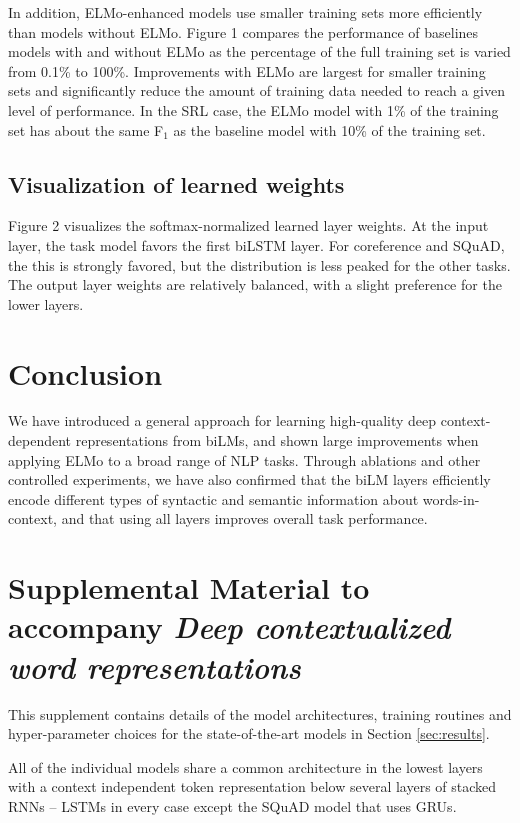 \documentclass[11pt,a4paper]{article}
\newcommand{\ELMO}{ELMo}
\begin{document}
In addition, \ELMO{}-enhanced models use smaller training sets more efficiently than models without \ELMO.
Figure 1 compares the performance of baselines models with and without \ELMO{} as the percentage of the full training set is varied from 0.1\% to 100\%.
Improvements with \ELMO{} are largest for smaller training sets and significantly reduce the amount of training data needed to reach a given level of performance.
In the SRL case, the \ELMO{} model with 1\% of the training set has about the same F$_1$ as the baseline model with 10\% of the training set.

\subsection{Visualization of learned weights}
\label{sec:visualize_weights}
Figure 2 visualizes the softmax-normalized learned layer weights. 
At the input layer, the task model favors the first biLSTM layer.
For coreference and SQuAD, the this is strongly favored, but the distribution is less peaked for the other tasks.
The output layer weights are relatively balanced, with a slight preference for the lower layers.

\section{Conclusion}  
We have introduced a general approach for learning high-quality deep context-dependent representations from biLMs, and shown large improvements when applying \ELMO{} to a broad range of NLP tasks.
Through ablations and other controlled experiments, we have also confirmed that the biLM layers efficiently encode different types of syntactic and semantic information about words-in-context, and that using all layers improves overall task performance.




\clearpage
\appendix
\setcounter{page}{1}
\section{Supplemental Material to accompany {\em Deep contextualized word representations}}

This supplement contains details of the model architectures, training routines and hyper-parameter choices for the state-of-the-art models in Section \ref{sec:results}.

All of the individual models share a common architecture in the lowest layers with a context independent token representation below several layers of stacked RNNs
-- LSTMs in every case except the SQuAD model that uses GRUs.
\end{document}
